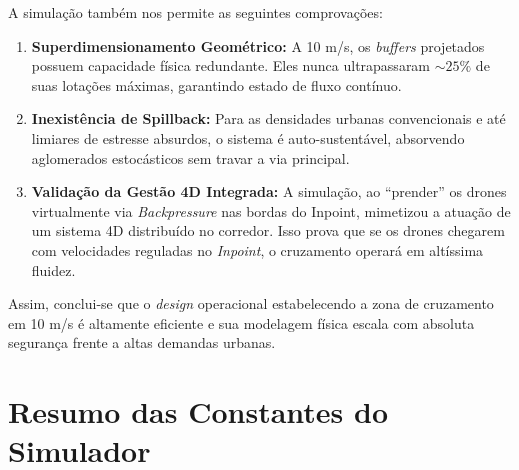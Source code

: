 \documentclass[12pt,a4paper]{article}
\begin{document}
A simulação também nos permite as seguintes comprovações:
\begin{enumerate}
    \item \textbf{Superdimensionamento Geométrico:} A 10 m/s, os \textit{buffers} projetados possuem capacidade física redundante. Eles nunca ultrapassaram $\sim 25\%$ de suas lotações máximas, garantindo estado de fluxo contínuo.
    \item \textbf{Inexistência de Spillback:} Para as densidades urbanas convencionais e até limiares de estresse absurdos, o sistema é auto-sustentável, absorvendo aglomerados estocásticos sem travar a via principal.
    \item \textbf{Validação da Gestão 4D Integrada:} A simulação, ao ``prender'' os drones virtualmente via \textit{Backpressure} nas bordas do Inpoint, mimetizou a atuação de um sistema 4D distribuído no corredor. Isso prova que se os drones chegarem com velocidades reguladas no \textit{Inpoint}, o cruzamento operará em altíssima fluidez.
\end{enumerate}

Assim, conclui-se que o \textit{design} operacional estabelecendo a zona de cruzamento em 10 m/s é altamente eficiente e sua modelagem física escala com absoluta segurança frente a altas demandas urbanas.

\section{Resumo das Constantes do Simulador}
\label{sec:constantes}
\end{document}
